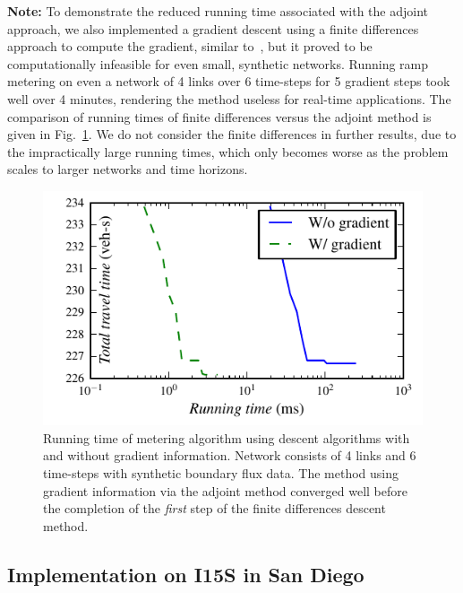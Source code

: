 \textbf{Note: } To demonstrate the reduced running time associated with the adjoint approach, we also implemented a gradient descent using a finite differences approach to compute the gradient, similar to~\cite{Frejo2011,Ramon2013}, but it proved to be computationally infeasible for even small, synthetic
networks. Running ramp metering on even a network of 4 links over
6 time-steps for 5 gradient steps took well over 4 minutes,
rendering the method useless for real-time applications. The comparison
of running times of finite differences versus the adjoint method is given in
Fig.~\ref{fig:Running-time-of}. We do not consider the finite differences in further results, due to the impractically large running times, which only becomes worse as the problem scales to larger networks and time horizons.
\begin{figure}[H]
\begin{centering}
\includegraphics[width=0.5\columnwidth]{images/itergrad}
\par\end{centering}

\caption{Running time of metering algorithm using descent algorithms with and without gradient information.
Network consists of 4 links and 6 time-steps with synthetic boundary
flux data. The method using gradient information via the adjoint
method converged well before the completion of the \textit{first} step of the finite differences descent method.
\label{fig:Running-time-of}}
\end{figure}



\subsection{Implementation on I15S in San Diego\label{sub:Network}}

